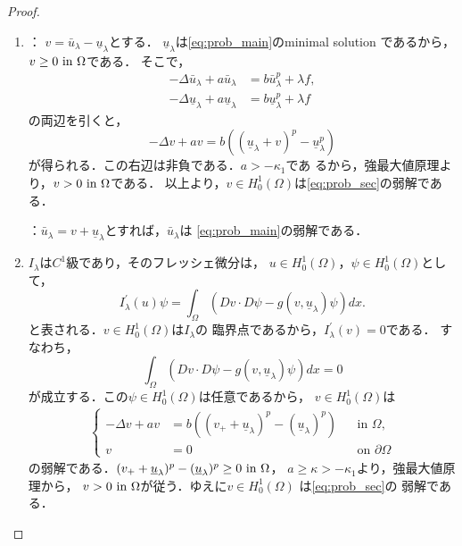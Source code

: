 \begin{proof}
 \begin{enumerate}[1.] \sage
  \item {}：
        $v = \bar{u}_\lambda - \underline{u}_\lambda$とする．
        $\underline{u}_\lambda$は\ref{eq:prob_main}のminimal solution
        であるから，$v \geq 0 ~\text{in}~ \Omega$である．
        そこで，
        \begin{align*}
         -\Delta \bar{u}_\lambda + a \bar{u}_\lambda &= b
         \bar{u}_\lambda^p + \lambda f, \\
         -\Delta \underline{u}_\lambda + a \underline{u}_\lambda &= b
         \underline{u}_\lambda^p + \lambda f
        \end{align*}
        の両辺を引くと，
        \[
        -\Delta v + a v = b \left( (\underline{u}_\lambda + v)^p -
        \underline{u}_\lambda^p \right)
        \]
        が得られる．この右辺は非負である．$a > -\kappa_1$であ
        るから，強最大値原理より，$v > 0 ~\text{in}~ \Omega$である．
        以上より，$v \in H_0^1(\Omega)$は\ref{eq:prob_sec}の弱解である．

        ：$\bar{u}_\lambda = v +
        \underline{u}_\lambda$とすれば，$\bar{u}_\lambda$は
        \ref{eq:prob_main}の弱解である．
  \item $I_\lambda$は$C^1$級であり，そのフレッシェ微分は，
        $u \in H_0^1(\Omega)$，$\psi \in H_0^1(\Omega)$として，
        \[
         I^\prime_\lambda(u)\psi = \int_\Omega \left( Dv \cdot D\psi -
        g(v, \underline{u}_\lambda) \psi \right) dx.
        \]
        と表される．$v \in H_0^1(\Omega)$は$I_\lambda$の
        臨界点であるから，$I^\prime_\lambda(v) = 0$である．
        すなわち，
        \begin{equation}
         \int_\Omega \left( Dv \cdot D\psi - g(v,
                      \underline{u}_\lambda)\psi \right) dx = 0
         \label{eq:weak_sol_of_heart}        
        \end{equation}
        が成立する．この$\psi \in H_0^1(\Omega)$は任意であるから，
        $v \in H_0^1(\Omega)$は
        \begin{align}
         \left\{
          \begin{aligned}
           -\Delta v + a v &= b \left( (v_+ + \underline{u}_\lambda)^p -
           (\underline{u}_\lambda)^p \right) 
           & &\text{in~} \Omega, \\
           v &= 0 & &\text{on~} \partial\Omega
          \end{aligned}
         \right.
        \end{align}
        の弱解である．$(v_+ + \underline{u}_\lambda)^p -
           (\underline{u}_\lambda)^p \geq 0 ~\text{in}~ \Omega$，
        $a \geq \kappa > -\kappa_1$より，強最大値原理から，
        $v > 0 ~\text{in}~ \Omega$が従う．ゆえに$v \in H_0^1(\Omega)$
        は\ref{eq:prob_sec}の
        弱解である． \qedhere
 \end{enumerate}
\end{proof}

